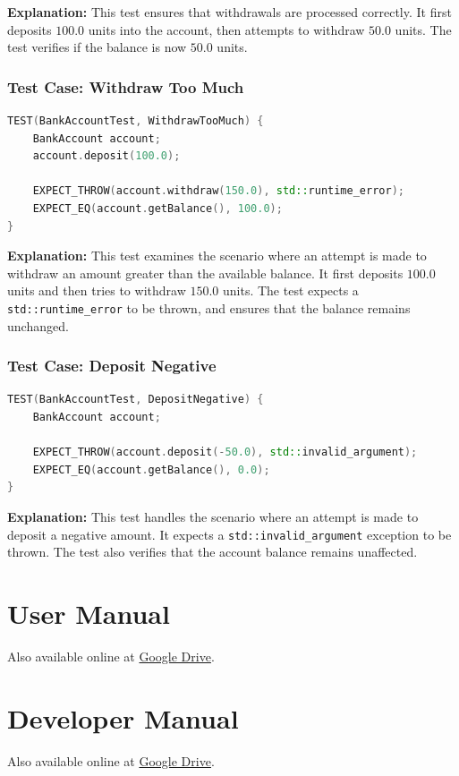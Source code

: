 \textbf{Explanation:} This test ensures that withdrawals are processed correctly. It first deposits $100.0$ units into the account, then attempts to withdraw $50.0$ units. The test verifies if the balance is now $50.0$ units.

\subsubsection*{Test Case: Withdraw Too Much}
\begin{lstlisting}[language=C++]
TEST(BankAccountTest, WithdrawTooMuch) {
    BankAccount account;
    account.deposit(100.0);

    EXPECT_THROW(account.withdraw(150.0), std::runtime_error);
    EXPECT_EQ(account.getBalance(), 100.0);
}
\end{lstlisting}

\textbf{Explanation:} This test examines the scenario where an attempt is made to withdraw an amount greater than the available balance. It first deposits $100.0$ units and then tries to withdraw $150.0$ units. The test expects a \texttt{std::runtime\_error} to be thrown, and ensures that the balance remains unchanged.

\subsubsection*{Test Case: Deposit Negative}
\begin{lstlisting}[language=C++]
TEST(BankAccountTest, DepositNegative) {
    BankAccount account;

    EXPECT_THROW(account.deposit(-50.0), std::invalid_argument);
    EXPECT_EQ(account.getBalance(), 0.0);
}
\end{lstlisting}

\textbf{Explanation:} This test handles the scenario where an attempt is made to deposit a negative amount. It expects a \texttt{std::invalid\_argument} exception to be thrown. The test also verifies that the account balance remains unaffected.


\section{User Manual}

Also available online at \href{https://drive.google.com/file/d/1CKM41b0lVNlPVhcOHVzftnJ13RWR5m6Y/view?usp=drive_link}{Google Drive}.



\section{Developer Manual}

Also available online at \href{https://drive.google.com/file/d/1Dm2La7uIj3iK4M7hl8aNyZqYd4_LneJs/view?usp=sharing}{Google Drive}.


